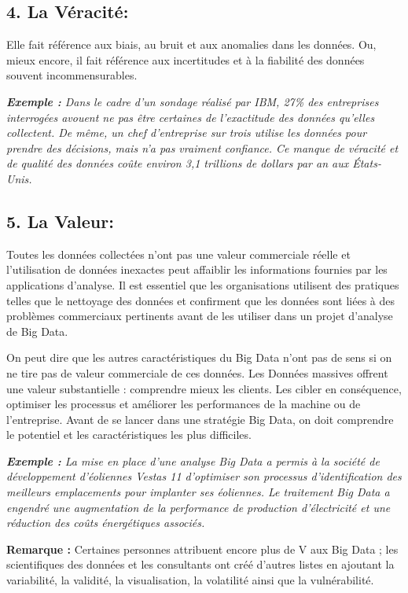 \subsection*{4. La Véracité:}
Elle fait référence aux biais, au bruit et aux anomalies dans les données. Ou, mieux encore, il fait référence aux incertitudes et à la fiabilité des données souvent incommensurables.

\textit{\textbf{Exemple :} Dans le cadre d'un sondage réalisé par IBM, 27\% des entreprises interrogées avouent ne pas être certaines de l'exactitude des données qu'elles collectent. De même, un chef d'entreprise sur trois utilise les données pour prendre des décisions, mais n'a pas vraiment confiance. Ce manque de véracité et de qualité des données coûte environ 3,1 trillions de dollars par an aux États-Unis.}

\subsection*{5. La Valeur:}
Toutes les données collectées n'ont pas une valeur commerciale réelle et l'utilisation de données inexactes peut affaiblir les informations fournies par les applications d'analyse. Il est essentiel que les organisations utilisent des pratiques telles que le nettoyage des données et confirment que les données sont liées à des problèmes commerciaux pertinents avant de les utiliser dans un projet d'analyse de Big Data. 

On peut dire que les autres caractéristiques du Big Data n'ont pas de sens si on ne tire pas de valeur commerciale de ces données. Les Données massives offrent une valeur substantielle : comprendre mieux les clients. Les cibler en conséquence, optimiser les processus et améliorer les performances de la machine ou de l'entreprise. Avant de se lancer dans une stratégie Big Data, on doit comprendre le potentiel et les caractéristiques les plus difficiles.

\textit{\textbf{Exemple :} La mise en place d'une analyse Big Data a permis à la société de développement d'éoliennes Vestas 11 d'optimiser son processus d'identification des meilleurs emplacements pour implanter ses éoliennes. Le traitement Big Data a engendré une augmentation de la performance de production d'électricité et une réduction des coûts énergétiques associés.}

\textbf{Remarque :} Certaines personnes attribuent encore plus de V aux Big Data ; les scientifiques des données et les consultants ont créé d'autres listes en ajoutant la variabilité, la validité, la visualisation, la volatilité ainsi que la vulnérabilité.

